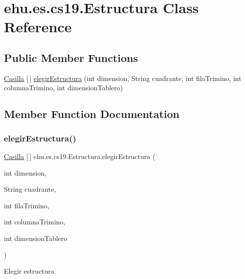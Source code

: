\hypertarget{classehu_1_1es_1_1cs19_1_1_estructura}{}\section{ehu.\+es.\+cs19.\+Estructura Class Reference}
\label{classehu_1_1es_1_1cs19_1_1_estructura}
\subsection*{Public Member Functions}
\begin{DoxyCompactItemize}
\item 
\mbox{\hyperlink{classehu_1_1es_1_1cs19_1_1_casilla}{Casilla}} \mbox{[}$\,$\mbox{]} \mbox{\hyperlink{classehu_1_1es_1_1cs19_1_1_estructura_adcecd97d9b2ed68462da170a67a2a3a7}{elegir\+Estructura}} (int dimension, String cuadrante, int fila\+Trimino, int columna\+Trimino, int dimension\+Tablero)
\end{DoxyCompactItemize}


\subsection{Member Function Documentation}
\mbox{\label{classehu_1_1es_1_1cs19_1_1_estructura_adcecd97d9b2ed68462da170a67a2a3a7}} 
\subsubsection{\texorpdfstring{elegirEstructura()}{elegirEstructura()}}
{\footnotesize\ttfamily \mbox{\hyperlink{classehu_1_1es_1_1cs19_1_1_casilla}{Casilla}} \mbox{[}$\,$\mbox{]} ehu.\+es.\+cs19.\+Estructura.\+elegir\+Estructura (\begin{DoxyParamCaption}\item[{int}]{dimension,  }\item[{String}]{cuadrante,  }\item[{int}]{fila\+Trimino,  }\item[{int}]{columna\+Trimino,  }\item[{int}]{dimension\+Tablero }\end{DoxyParamCaption})}

Elegir estructura.


